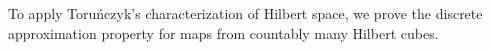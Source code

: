 To apply Toru\'nczyk's characterization of Hilbert space,
we prove the discrete approximation property for maps from countably many Hilbert cubes.
